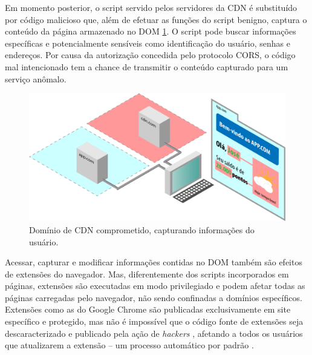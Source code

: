 Em momento posterior, o script servido pelos servidores da CDN é substituído por código malicioso que, além de efetuar as funções do script benigno, captura o conteúdo da página armazenado no DOM \ref{Fig: diagrama02}. O script pode buscar informações específicas e potencialmente sensíveis como identificação do usuário, senhas e endereços. Por causa da autorização concedida pelo protocolo CORS, o código mal intencionado tem a chance de transmitir o conteúdo capturado para um serviço anômalo.

\begin{figure}
	\centering
	\includegraphics[width=15cm]{diagramas/diagrama02.pdf}
	\caption{Domínio de CDN comprometido, capturando informações do usuário.}
	\label{Fig: diagrama02}
\end{figure}

Acessar, capturar e modificar informações contidas no DOM também são efeitos de extensões do navegador. Mas, diferentemente dos scripts incorporados em páginas, extensões são executadas em modo privilegiado e podem afetar todas as páginas carregadas pelo navegador, não sendo confinadas a domínios específicos. Extensões como as do Google Chrome são publicadas exclusivamente em site específico e protegido, mas não é impossível que o código fonte de extensões seja descaracterizado e publicado pela ação de \textit{hackers} \cite{Spring2017}, afetando a todos os usuários que atualizarem a extensão -- um processo automático por padrão \cite{Google2017}. 

